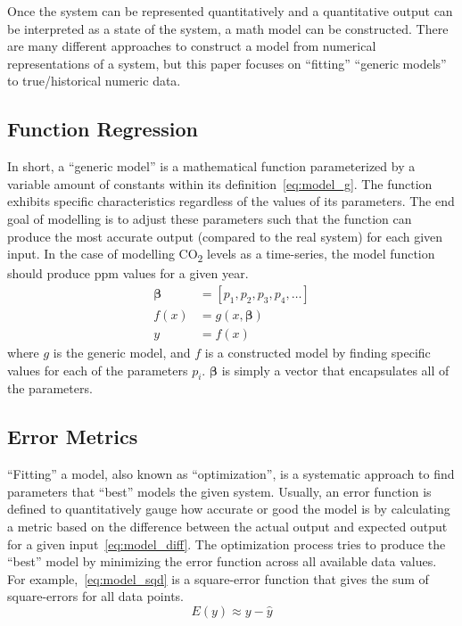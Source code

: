 \documentclass{mcmthesis}
\begin{document}
    Once the system can be represented quantitatively and a quantitative output can be interpreted as a state of the system, a math model can be constructed. There are many different approaches to construct a model from numerical representations of a system, but this paper focuses on ``fitting'' ``generic models'' to true/historical numeric data.

    \subsection{Function Regression}

    In short, a ``generic model'' is a mathematical function parameterized by a variable amount of constants within its definition~\eqref{eq:model_g}. The function exhibits specific characteristics regardless of the values of its parameters. The end goal of modelling is to adjust these parameters such that the function can produce the most accurate output (compared to the real system) for each given input. In the case of modelling CO\textsubscript{2} levels as a time-series, the model function should produce ppm values for a given year.
%
    \begin{equation}
        \begin{aligned}
            \bm{\beta} &= [p_1, p_2, p_3, p_4, \dots] \\
            f(x) &= g(x, \bm{\beta}) \\
            y &= f(x)
        \end{aligned}
        \label{eq:model_g}
    \end{equation}
%
    \noindent where $g$ is the generic model, and $f$ is a constructed model by finding specific values for each of the parameters $p_i$. $\bm{\beta}$ is simply a vector that encapsulates all of the parameters.

    \subsection{Error Metrics}

    ``Fitting'' a model, also known as ``optimization'', is a systematic approach to find parameters that ``best'' models the given system. Usually, an error function is defined to quantitatively gauge how accurate or good the model is by calculating a metric based on the difference between the actual output and expected output for a given input~\eqref{eq:model_diff}. The optimization process tries to produce the ``best'' model by minimizing the error function across all available data values. For example,~\eqref{eq:model_sqd} is a square-error function that gives the sum of square-errors for all data points.
%
    \begin{equation}
        E(y) \approx y - \hat y
        \label{eq:model_diff}
    \end{equation}
\end{document}
